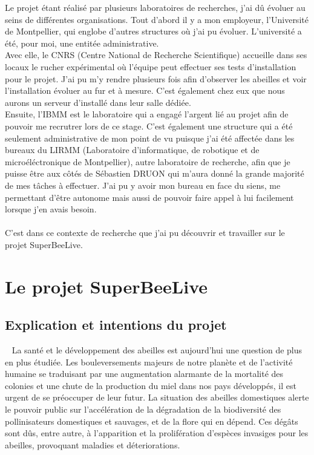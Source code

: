 \documentclass[11pt,french,a4paper]{report}
\begin{document}
Le projet étant réalisé par plusieurs laboratoires de recherches, j'ai dû évoluer au seins de différentes organisations. 
Tout d'abord il y a mon employeur, l'Université de Montpellier, qui englobe d'autres structures où j'ai pu évoluer. 
L'université a été, pour moi, une entitée administrative. \\ 
Avec elle, le CNRS (Centre National de Recherche Scientifique) accueille dans ses locaux le rucher expérimental où 
l'équipe peut effectuer ses tests d'installation pour le projet. J'ai pu m'y rendre plusieurs fois afin d'observer les abeilles
et voir l'installation évoluer au fur et à mesure. C'est également chez eux que nous aurons un serveur d'installé dans leur salle dédiée.\\
Ensuite, l'IBMM est le laboratoire qui a engagé l'argent lié au projet afin de pouvoir me recrutrer lors de ce stage. 
C'est également une structure qui a été seulement administrative de mon point de vu puisque j'ai été affectée dans 
les bureaux du LIRMM (Laboratoire d'informatique, de robotique et de microéléctronique de Montpellier), autre laboratoire de 
recherche, afin que je puisse être aux côtés de Sébastien DRUON qui m'aura donné la grande majorité de mes tâches à effectuer. 
J'ai pu y avoir mon bureau en face du siens, me permettant d'être autonome mais aussi de pouvoir faire
appel à lui facilement lorsque j'en avais besoin.\\
\\
C'est dans ce contexte de recherche que j'ai pu découvrir et travailler sur le projet SuperBeeLive. \\ 


\section{Le projet SuperBeeLive}
\subsection{Explication et intentions du projet}
 
La santé et le développement des abeilles est aujourd’hui une question de plus en plus étudiée. Les bouleversements
majeurs de notre planète et de l’activité humaine se traduisant par une augmentation alarmante de la mortalité
des colonies et une chute de la production du miel dans nos pays développés, il est urgent de se préoccuper de leur futur. 
La situation des abeilles domestiques alerte le pouvoir public sur l’accélération de la dégradation de la biodiversité des 
pollinisateurs domestiques et sauvages, et de la flore qui en dépend. Ces dégâts sont dûs, entre autre, à l’apparition 
et la prolifération d’espèces invasiges pour les abeilles, provoquant maladies et déteriorations. 
\end{document}

